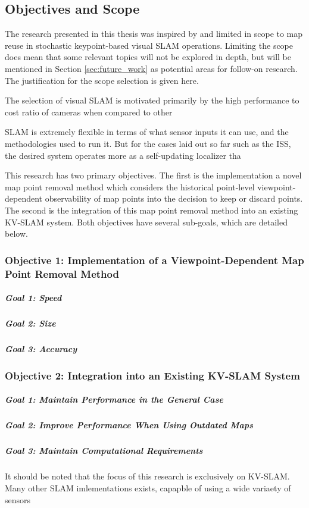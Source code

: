 \subsection{Objectives and Scope}
\label{objectives}

The research presented in this thesis was inspired by and limited in scope to map reuse in stochastic keypoint-based visual SLAM operations. Limiting the scope does mean that some relevant topics will not be explored in depth, but will be mentioned in Section \ref{sec:future_work} as potential areas for follow-on research. The justification for the scope selection is given here.

The selection of visual SLAM is motivated primarily by the high performance to cost ratio of cameras when compared to other 

SLAM is extremely flexible in terms of what sensor inputs it can use, and the methodologies used to run it. But for the cases laid out so far such as the ISS, the desired system operates more as a self-updating localizer tha

This research has two primary objectives. The first is the implementation a novel map point removal method which considers the historical point-level viewpoint-dependent observability of map points into the decision to keep or discard points. The second is the integration of this map point removal method into an existing KV-SLAM system. Both objectives have several sub-goals, which are detailed below.

\subsubsection*{Objective 1: Implementation of a Viewpoint-Dependent Map Point Removal Method}

\subparagraph{Goal 1: Speed}
\subparagraph{Goal 2: Size}
\subparagraph{Goal 3: Accuracy}

\subsubsection*{Objective 2: Integration into an Existing KV-SLAM System}

\subparagraph{Goal 1: Maintain Performance in the General Case}
\subparagraph{Goal 2: Improve Performance When Using Outdated Maps}
\subparagraph{Goal 3: Maintain Computational Requirements}



It should be noted that the focus of this research is exclusively on KV-SLAM. Many other SLAM imlementations exists, capapble of using a wide variaety of sensors

